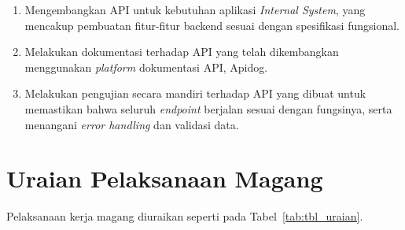 \begin{enumerate}
    \item Mengembangkan API untuk kebutuhan aplikasi \textit{Internal System}, yang mencakup pembuatan fitur-fitur backend sesuai dengan spesifikasi fungsional.
    \item Melakukan dokumentasi terhadap API yang telah dikembangkan menggunakan \textit{platform} dokumentasi API, Apidog.
    \item Melakukan pengujian secara mandiri terhadap API yang dibuat untuk memastikan bahwa seluruh \textit{endpoint} berjalan sesuai dengan fungsinya, serta menangani \textit{error handling} dan validasi data.
\end{enumerate}


\section{Uraian Pelaksanaan Magang}
Pelaksanaan kerja magang diuraikan seperti pada Tabel~\ref{tab:tbl_uraian}.

